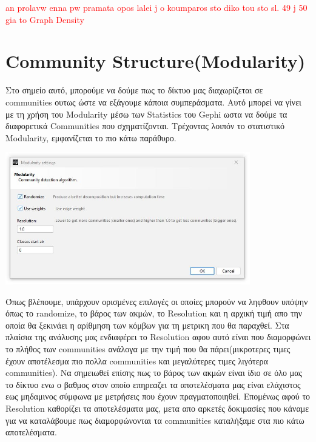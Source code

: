 \documentclass[12pt]{article}
\begin{document}
	\textcolor{red}{an prolavw enna pw pramata opos lalei j o koumparos sto diko tou sto sl. 49 j 50 gia to Graph Density}
	\label{chap:graph_density_11}
	
	
	
	
	\newpage
	\section{Community Structure(Modularity)}
	Στο σημείο αυτό, μπορούμε να δούμε πως το δίκτυο μας διαχωρίζεται σε communities ουτως ώστε να εξάγουμε κάποια συμπεράσματα. Αυτό μπορεί να γίνει με τη χρήση του Modularity μέσω των Statistics του Gephi ωστα να δούμε τα διαφορετικά Communities που σχηματίζονται. Τρέχοντας λοιπόν το στατιστικό Modularity, εμφανίζεται το πιο κάτω παράθυρο.
	\begin{center}
		\includegraphics[width=0.8\textwidth]{photos-files/section12/eisagogi_modularity_twn_statistics.JPG}
	\end{center}
	Όπως βλέπουμε, υπάρχουν ορισμένες επιλογές οι οποίες μπορούν να ληφθουν υπόψην όπως το randomize, το βάρος των ακμών, το Resolution και η αρχική τιμή απο την οποία θα ξεκινάει η αρίθμηση των κόμβων για τη μετρικη που θα παραχθεί. Στα πλαίσια της ανάλυσης μας ενδιαφέρει το Resolution αφου αυτό είναι που διαμορφώνει το πλήθος των communities ανάλογα με την τιμή που θα πάρει(μικροτερες τιμες έχουν αποτέλεσμα πιο πολλα communities και μεγαλύτερες τιμες λιγότερα communities). Να σημειωθεί επίσης πως το βάρος των ακμών είναι ίδιο σε όλο μας το δίκτυο ενω ο βαθμος στον οποίο επηρεαζει τα αποτελέσματα μας είναι ελάχιστος εως μηδαμινος σύμφωνα με μετρήσεις που έχουν πραγματοποιηθεί. Επομένως αφού το Resolution καθορίζει τα αποτελέσματα μας, μετα απο αρκετές δοκιμασίες που κάναμε για να καταλάβουμε πως διαμορφώνονται τα communities καταλήξαμε στα πιο κάτω αποτελέσματα.
	
	\newpage
\end{document}
